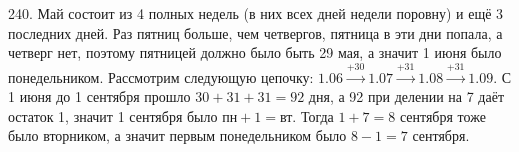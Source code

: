 240. Май состоит из 4 полных недель (в них всех дней недели поровну) и ещё 3 последних дней. Раз пятниц больше, чем четвергов, пятница в эти дни попала, а четверг нет, поэтому пятницей должно было быть 29 мая, а значит 1 июня было понедельником. Рассмотрим следующую цепочку:
$1.06\stackrel{+30}{\rightarrow}1.07\stackrel{+31}{\rightarrow}1.08\stackrel{+31}{\rightarrow}1.09.$ С 1 июня до 1 сентября прошло $30+31+31=92$ дня, а 92 при делении на 7 даёт остаток 1, значит 1 сентября было $\text{пн}+1=\text{вт}.$ Тогда $1+7=8$ сентября тоже было вторником, а значит первым понедельником было $8-1=7$ сентября.\\
